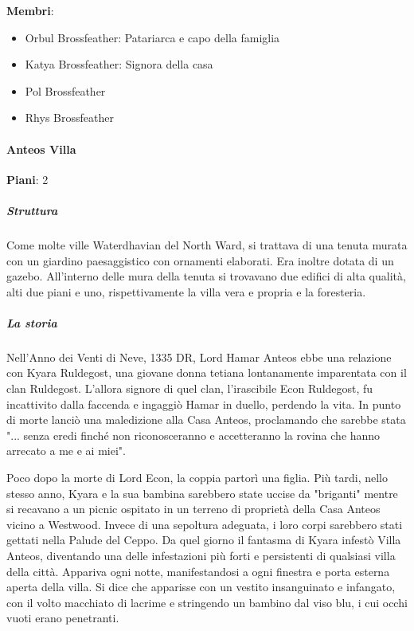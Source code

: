 \documentclass{article}
\begin{document}
                    \textbf{Membri}:
                    \begin{itemize}
                        \item Orbul Brossfeather: Patariarca e capo della famiglia
                        \item Katya Brossfeather: Signora della casa
                        \item Pol Brossfeather
                        \item Rhys Brossfeather
                    \end{itemize}

              \paragraph{Anteos Villa}
                                \textbf{Piani}: 2\newline

                                    \subparagraph{Struttura}
              Come molte ville Waterdhavian del North Ward, si trattava di una tenuta murata con un giardino paesaggistico con ornamenti elaborati. Era inoltre dotata di un gazebo. All'interno delle mura della tenuta si trovavano due edifici di alta qualità, alti due piani e uno, rispettivamente la villa vera e propria e la foresteria.

                                    \subparagraph{La storia}
              Nell'Anno dei Venti di Neve, 1335 DR, Lord Hamar Anteos ebbe una relazione con Kyara Ruldegost, una giovane donna tetiana lontanamente imparentata con il clan Ruldegost. L'allora signore di quel clan, l'irascibile Econ Ruldegost, fu incattivito dalla faccenda e ingaggiò Hamar in duello, perdendo la vita. In punto di morte lanciò una maledizione alla Casa Anteos, proclamando che sarebbe stata "... senza eredi finché non riconosceranno e accetteranno la rovina che hanno arrecato a me e ai miei".

              Poco dopo la morte di Lord Econ, la coppia partorì una figlia. Più tardi, nello stesso anno, Kyara e la sua bambina sarebbero state uccise da "briganti" mentre si recavano a un picnic ospitato in un terreno di proprietà della Casa Anteos vicino a Westwood. Invece di una sepoltura adeguata, i loro corpi sarebbero stati gettati nella Palude del Ceppo.
              Da quel giorno il fantasma di Kyara infestò Villa Anteos, diventando una delle infestazioni più forti e persistenti di qualsiasi villa della città. Appariva ogni notte, manifestandosi a ogni finestra e porta esterna aperta della villa. Si dice che apparisse con un vestito insanguinato e infangato, con il volto macchiato di lacrime e stringendo un bambino dal viso blu, i cui occhi vuoti erano penetranti.
\end{document}
